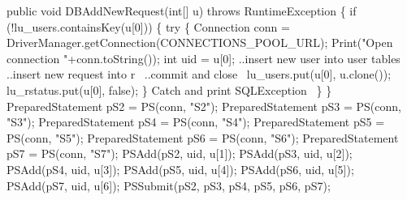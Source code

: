 \documentclass{article}
\def\nwendcode{\endtrivlist \endgroup}      %
\let\nwdocspar=\par
\theoremstyle{definition}                   %
\begin{document}
\nwenddocs{}\endmoddef{}
public void DBAddNewRequest(int[] u) throws RuntimeException \{
  if (!lu_users.containsKey(u[0])) \{
    try \{
      Connection conn = DriverManager.getConnection(CONNECTIONS_POOL_URL);
      Print("Open connection "+conn.toString());
      int uid = u[0];
      \LA{}..insert new user into user tables~{\nwtagstyle{}}\RA{}
      \LA{}..insert new request into r~{\nwtagstyle{}}\RA{}
      \LA{}..commit and close~{\nwtagstyle{}}\RA{}
      lu_users.put(u[0], u.clone());
      lu_rstatus.put(u[0], false);
    \}
    \LA{}Catch and print \code{}SQLException\edoc{}~{\nwtagstyle{}}\RA{}
  \}
\}
\eatline
{}\nwendcode{}\endmoddef{}
PreparedStatement pS2 = PS(conn, "S2");
PreparedStatement pS3 = PS(conn, "S3");
PreparedStatement pS4 = PS(conn, "S4");
PreparedStatement pS5 = PS(conn, "S5");
PreparedStatement pS6 = PS(conn, "S6");
PreparedStatement pS7 = PS(conn, "S7");
PSAdd(pS2, uid, u[1]);
PSAdd(pS3, uid, u[2]);
PSAdd(pS4, uid, u[3]);
PSAdd(pS5, uid, u[4]);
PSAdd(pS6, uid, u[5]);
PSAdd(pS7, uid, u[6]);
PSSubmit(pS2, pS3, pS4, pS5, pS6, pS7);
\nwendcode{}\nwdocspar
\end{document}
